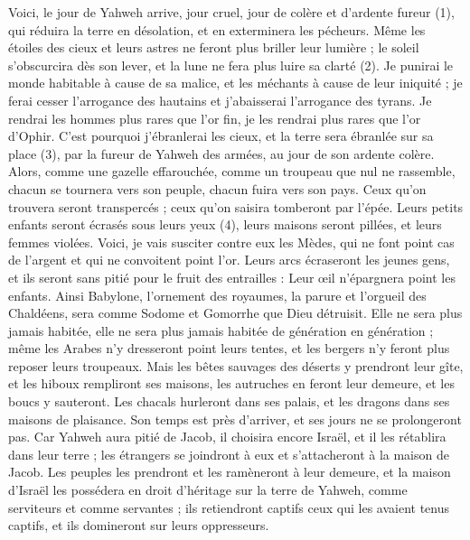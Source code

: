 \begin{multicols}{2}
Voici, le jour de Yahweh arrive, jour cruel, jour de colère et d’ardente fureur (1), qui réduira la terre en désolation, et en exterminera les pécheurs.
Même les étoiles des cieux et leurs astres ne feront plus briller leur lumière ; le soleil s'obscurcira dès son lever, et la lune ne fera plus luire sa clarté (2).
Je punirai le monde habitable à cause de sa malice, et les méchants à cause de leur iniquité ; je ferai cesser l'arrogance des hautains et j'abaisserai l’arrogance des tyrans.
Je rendrai les hommes plus rares que l’or fin, je les rendrai plus rares que l’or d’Ophir.
C'est pourquoi j’ébranlerai les cieux, et la terre sera ébranlée sur sa place (3), par la fureur de Yahweh des armées, au jour de son ardente colère.
Alors, comme une gazelle effarouchée, comme un troupeau que nul ne rassemble, chacun se tournera vers son peuple, chacun fuira vers son pays.
Ceux qu’on trouvera seront transpercés ; ceux qu’on saisira tomberont par l’épée.
Leurs petits enfants seront écrasés sous leurs yeux (4), leurs maisons seront pillées, et leurs femmes violées.
Voici, je vais susciter contre eux les Mèdes, qui ne font point cas de l’argent et qui ne convoitent point l'or.
Leurs arcs écraseront les jeunes gens, et ils seront sans pitié pour le fruit des entrailles : Leur œil n'épargnera point les enfants.
Ainsi Babylone, l’ornement des royaumes, la parure et l'orgueil des Chaldéens, sera comme Sodome et Gomorrhe que Dieu détruisit.
Elle ne sera plus jamais habitée, elle ne sera plus jamais habitée de génération en génération ; même les Arabes n'y dresseront point leurs tentes, et les bergers n'y feront plus reposer leurs troupeaux.
Mais les bêtes sauvages des déserts y prendront leur gîte, et les hiboux rempliront ses maisons, les autruches en feront leur demeure, et les boucs y sauteront.
Les chacals hurleront dans ses palais, et les dragons dans ses maisons de plaisance. Son temps est près d’arriver, et ses jours ne se prolongeront pas.
\VerseOne{}Car Yahweh aura pitié de Jacob, il choisira encore Israël, et il les rétablira dans leur terre ; les étrangers se joindront à eux et s'attacheront à la maison de Jacob.
Les peuples les prendront et les ramèneront à leur demeure, et la maison d'Israël les possédera en droit d'héritage sur la terre de Yahweh, comme serviteurs et comme servantes ; ils retiendront captifs ceux qui les avaient tenus captifs, et ils domineront sur leurs oppresseurs.

\end{multicols}
